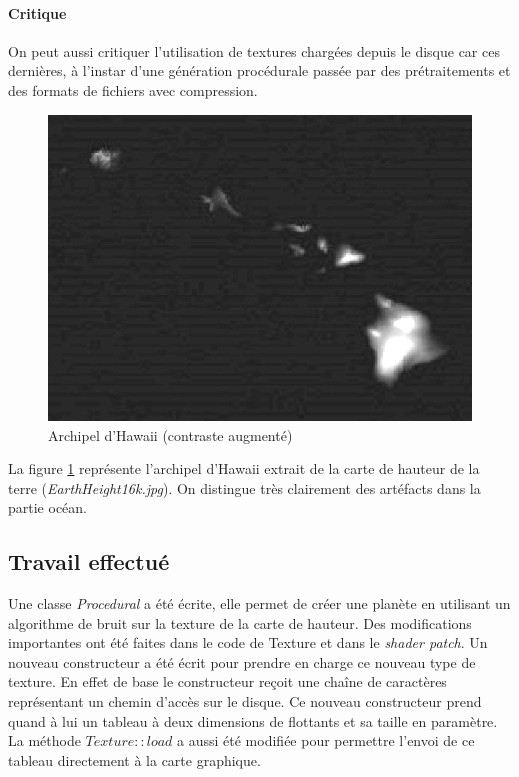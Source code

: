     \paragraph{Critique} On peut aussi critiquer l'utilisation de textures chargées depuis le disque car ces dernières, à l'instar d'une génération procédurale passée par des prétraitements et des formats de fichiers avec compression.
    
    \begin{figure}
        \centering
        \includegraphics[width=12cm]{img/hawaii2.png}
        \caption{Archipel d'Hawaii (contraste augmenté)}
        \label{fig:hawaii}
    \end{figure}
    
    La figure \ref{fig:hawaii} représente l'archipel d'Hawaii extrait de la carte de hauteur de la terre
    (\textit{EarthHeight16k.jpg}). On distingue très clairement des artéfacts dans la partie océan.
    
    \subsection{Travail effectué}
    Une classe \emph{Procedural} a été écrite, elle permet de créer une planète en utilisant un algorithme de bruit
    sur la texture de la carte de hauteur.
    Des modifications importantes ont été faites dans le code de Texture et dans le \emph{shader patch}.
    Un nouveau constructeur a été écrit pour prendre en charge ce nouveau type de texture. En effet de 
    base le constructeur reçoit une chaîne de caractères représentant un chemin d'accès sur le disque.
    Ce nouveau constructeur prend quand à lui un tableau à deux dimensions de flottants et sa taille en paramètre.\\
    La méthode $Texture::load$ a aussi été modifiée pour permettre l'envoi de ce tableau directement à la carte graphique.\\
    
